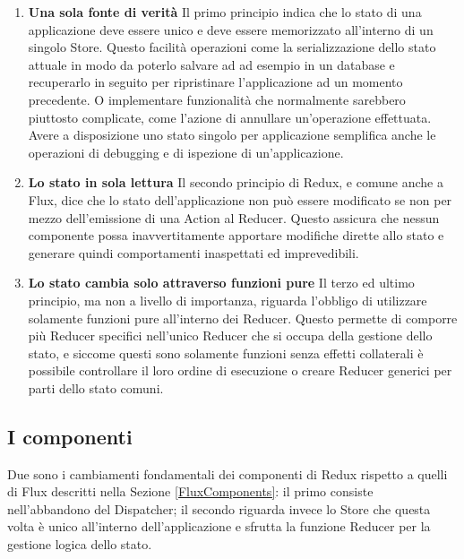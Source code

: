 \begin{enumerate}
    \item \textbf{Una sola fonte di verità} Il primo principio indica che lo stato di una applicazione deve essere unico e deve essere memorizzato all'interno di un singolo Store.
    Questo facilità operazioni come la serializzazione dello stato attuale in modo da poterlo salvare ad ad esempio in un database e recuperarlo in seguito per ripristinare l'applicazione ad un momento precedente. O implementare funzionalità che normalmente sarebbero piuttosto complicate, come l'azione di annullare un'operazione effettuata.
    Avere a disposizione uno stato singolo per applicazione semplifica anche le operazioni di debugging e di ispezione di un'applicazione.

    \item \textbf{Lo stato in sola lettura} Il secondo principio di Redux, e comune anche a Flux, dice che lo stato dell'applicazione non può essere modificato se non per mezzo dell'emissione di una Action al Reducer. Questo assicura che nessun componente possa inavvertitamente apportare modifiche dirette allo stato e generare quindi comportamenti inaspettati ed imprevedibili.

    \item \textbf{Lo stato cambia solo attraverso funzioni pure} Il terzo ed ultimo principio, ma non a livello di importanza, riguarda l'obbligo di utilizzare solamente funzioni pure all'interno dei Reducer. Questo permette di comporre più Reducer specifici nell'unico Reducer che si occupa della gestione dello stato, e siccome questi sono solamente funzioni senza effetti collaterali è possibile controllare il loro ordine di esecuzione o creare Reducer generici per parti dello stato comuni.
\end{enumerate}

\subsection{I componenti}
Due sono i cambiamenti fondamentali dei componenti di Redux rispetto a quelli di Flux descritti nella Sezione \ref{FluxComponents}: il primo consiste nell'abbandono del Dispatcher; il secondo riguarda invece lo Store che questa volta è unico all'interno dell'applicazione e sfrutta la funzione Reducer per la gestione logica dello stato.

